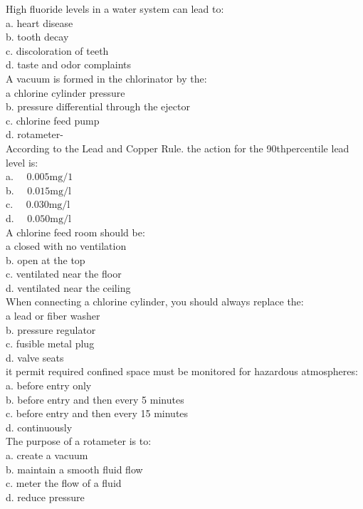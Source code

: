 High fluoride levels in a water system can lead to:\\
a. heart disease\\
b. tooth decay\\
c. discoloration of teeth\\
d. taste and odor complaints\\

A vacuum is formed in the chlorinator by the:\\
a chlorine cylinder pressure\\
b. pressure differential through the ejector\\
c. chlorine feed pump\\
d. rotameter-\\

According to the Lead and Copper Rule. the action for the 90thpercentile lead level is:\\
a. $\quad 0.005 \mathrm{mg} / \mathrm{1}$\\
b. $\quad 0.015 \mathrm{mg} / \mathrm{l}$\\
c. $\quad 0.030 \mathrm{mg} / \mathrm{l}$\\
d. $\quad 0.050 \mathrm{mg} / \mathrm{l}$\\

A chlorine feed room should be:\\
a closed with no ventilation\\
b. open at the top\\
c. ventilated near the floor\\
d. ventilated near the ceiling \\

When connecting a chlorine cylinder, you should always replace the:\\
a lead or fiber washer\\
b. pressure regulator\\
c. fusible metal plug\\
d. valve seats\\

it permit required confined space must be monitored for hazardous atmospheres:\\
a. before entry only\\
b. before entry and then every 5 minutes\\
c. before entry and then every 15 minutes\\
d. continuously\\

The purpose of a rotameter is to:\\
a. create a vacuum\\
b. maintain a smooth fluid flow\\
c. meter the flow of a fluid\\
d. reduce pressure\\

